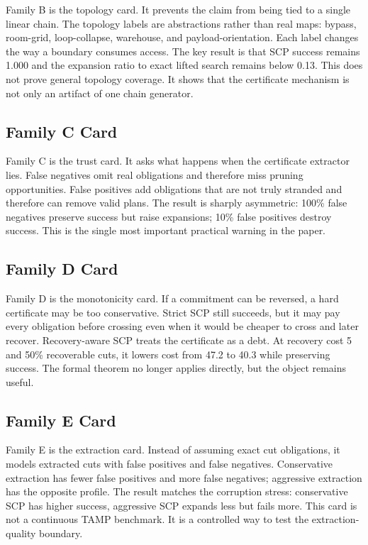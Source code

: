 \documentclass{article}
\begin{document}
Family B is the topology card. It prevents the claim from being tied to a single linear chain. The topology labels are abstractions rather than real maps: bypass, room-grid, loop-collapse, warehouse, and payload-orientation. Each label changes the way a boundary consumes access. The key result is that SCP success remains 1.000 and the expansion ratio to exact lifted search remains below 0.13. This does not prove general topology coverage. It shows that the certificate mechanism is not only an artifact of one chain generator.

\subsection{Family C Card}

Family C is the trust card. It asks what happens when the certificate extractor lies. False negatives omit real obligations and therefore miss pruning opportunities. False positives add obligations that are not truly stranded and therefore can remove valid plans. The result is sharply asymmetric: 100\% false negatives preserve success but raise expansions; 10\% false positives destroy success. This is the single most important practical warning in the paper.

\subsection{Family D Card}

Family D is the monotonicity card. If a commitment can be reversed, a hard certificate may be too conservative. Strict SCP still succeeds, but it may pay every obligation before crossing even when it would be cheaper to cross and later recover. Recovery-aware SCP treats the certificate as a debt. At recovery cost 5 and 50\% recoverable cuts, it lowers cost from 47.2 to 40.3 while preserving success. The formal theorem no longer applies directly, but the object remains useful.

\subsection{Family E Card}

Family E is the extraction card. Instead of assuming exact cut obligations, it models extracted cuts with false positives and false negatives. Conservative extraction has fewer false positives and more false negatives; aggressive extraction has the opposite profile. The result matches the corruption stress: conservative SCP has higher success, aggressive SCP expands less but fails more. This card is not a continuous TAMP benchmark. It is a controlled way to test the extraction-quality boundary.
\end{document}
